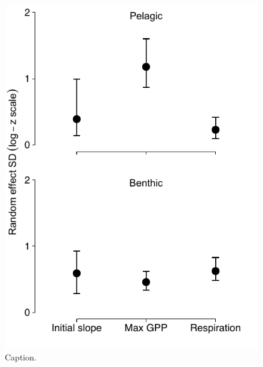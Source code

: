 \documentclass[12pt]{article}
\begin{document}
\clearpage




\begin{figure}
\centering
\linespread{1}
\includegraphics{../analysis/figures/fig_sd.pdf}
\caption{\label{fig:sd}
Caption.
}
\end{figure}

\clearpage

\end{document}
